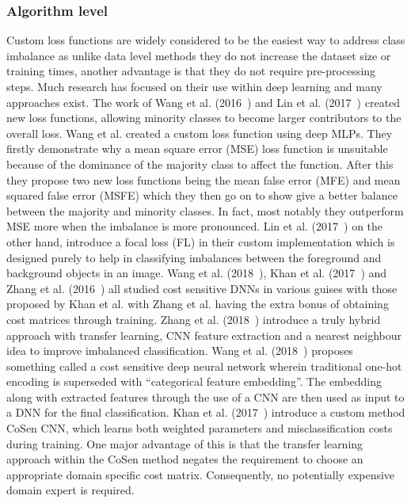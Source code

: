 \subsubsection{Algorithm level}\label{subsec:DeepLearningAlgoLevel}
Custom loss functions are widely considered to be the easiest way to address class imbalance as unlike data level methods they do not increase the dataset size or training times, another advantage is that they do not require pre-processing steps. Much research has focused on their use within deep learning and many approaches exist. The work of Wang et al. (2016~\cite{wang2016training}) and Lin et al. (2017~\cite{lin2017focal}) created new loss functions, allowing minority classes to become larger contributors to the overall loss. Wang et al. created a custom loss function using deep MLPs. They firstly demonstrate why a mean square error (MSE) loss function is unsuitable because of the dominance of the majority class to affect the function. After this they propose two new loss functions being the mean false error (MFE) and mean squared false error (MSFE) which they then go on to show give a better balance between the majority and minority classes. In fact, most notably they outperform MSE more when the imbalance is more pronounced. Lin et al. (2017~\cite{lin2017focal}) on the other hand, introduce a focal loss (FL) in their custom implementation which is designed purely to help in classifying imbalances between the foreground and background objects in an image. Wang et al. (2018~\cite{wang2018predicting}), Khan et al. (2017~\cite{khan2017cost}) and Zhang et al. (2016~\cite{zhang2016training}) all studied cost sensitive DNNs in various guises with those proposed by Khan et al. with Zhang et al. having the extra bonus of obtaining cost matrices through training. Zhang et al. (2018~\cite{zhang2018image}) introduce a truly hybrid approach with transfer learning, CNN feature extraction and a nearest neighbour idea to improve imbalanced classification. Wang et al. (2018~\cite{wang2018predicting}) proposes something called a cost sensitive deep neural network wherein traditional one-hot encoding is superseded with ``categorical feature embedding''. The embedding along with extracted features through the use of a CNN are then used as input to a DNN for the final classification. Khan et al. (2017~\cite{khan2017cost}) introduce a custom method CoSen CNN, which learns both weighted parameters and misclassification costs during training. One major advantage of this is that the transfer learning approach within the CoSen method negates the requirement to choose an appropriate domain specific cost matrix. Consequently, no potentially expensive domain expert is required.
\par
